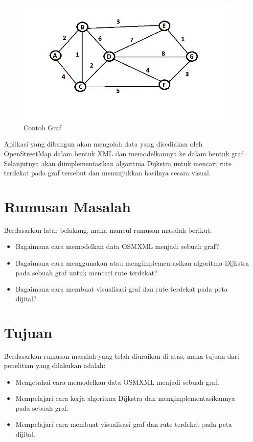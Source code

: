 \begin{figure}[h]
\centering
\includegraphics[scale=0.4]{Gambar/co_graf}
\caption[Contoh Graf]{Contoh Graf}
\label{fig:co_graf}
\end{figure}

Aplikasi yang dibangun akan mengolah data yang disediakan oleh OpenStreetMap
dalam bentuk XML dan memodelkannya ke dalam bentuk graf. Selanjutnya akan diimplementasikan algoritma
Dijkstra untuk mencari rute terdekat pada graf tersebut dan menunjukkan hasilnya secara visual.

\section{Rumusan Masalah}
Berdasarkan latar belakang, maka muncul rumusan masalah berikut: 
\begin{itemize}
	\item Bagaimana cara memodelkan data OSMXML menjadi sebuah graf?
	\item Bagaimana cara menggunakan atau mengimplementasikan algoritma Dijkstra
	pada sebuah graf untuk mencari rute terdekat?
	\item Bagaimana cara membuat visualisasi graf dan rute terdekat pada peta
	dijital?
\end{itemize}

\section{Tujuan}
Berdasarkan rumusan masalah yang telah diuraikan di atas, maka tujuan dari penelitian yang dilakukan
adalah:
\begin{itemize} 
	\item Mengetahui cara memodelkan data OSMXML menjadi sebuah	graf.
	\item Mempelajari cara kerja algoritma Dijkstra dan	mengimplementasikannya pada
	sebuah graf.
 	\item Mempelajari cara membuat visualisasi graf dan rute terdekat pada peta
 	dijital.
 \end{itemize}

